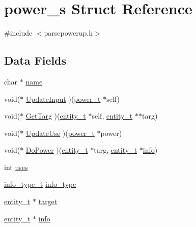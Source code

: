 \hypertarget{structpower__s}{}\section{power\+\_\+s Struct Reference}
\label{structpower__s}


{\ttfamily \#include $<$parsepowerup.\+h$>$}

\subsection*{Data Fields}
\begin{DoxyCompactItemize}
\item 
char $\ast$ \hyperlink{structpower__s_a5ac083a645d964373f022d03df4849c8}{name}
\item 
void($\ast$ \hyperlink{structpower__s_a99fd6ee1c03eaf0de0f3e2c71237db69}{Update\+Input} )(\hyperlink{parsepowerup_8h_a5b6034e874b6462f78a13c5202a4d2eb}{power\+\_\+t} $\ast$self)
\item 
void($\ast$ \hyperlink{structpower__s_a8e7faa42ca042b4df438d3c82427d2ee}{Get\+Targ} )(\hyperlink{entity_8h_ad0c3149de5542539dcb5c9251c68fbd2}{entity\+\_\+t} $\ast$self, \hyperlink{entity_8h_ad0c3149de5542539dcb5c9251c68fbd2}{entity\+\_\+t} $\ast$$\ast$targ)
\item 
void($\ast$ \hyperlink{structpower__s_a3cad653c3718314662c4a98659778999}{Update\+Use} )(\hyperlink{parsepowerup_8h_a5b6034e874b6462f78a13c5202a4d2eb}{power\+\_\+t} $\ast$power)
\item 
void($\ast$ \hyperlink{structpower__s_a0547996a48a142c5c5006ce1dd3020a5}{Do\+Power} )(\hyperlink{entity_8h_ad0c3149de5542539dcb5c9251c68fbd2}{entity\+\_\+t} $\ast$targ, \hyperlink{entity_8h_ad0c3149de5542539dcb5c9251c68fbd2}{entity\+\_\+t} $\ast$\hyperlink{structpower__s_abdbfaddb317fd1c7b9bdd58ea49d0395}{info})
\item 
int \hyperlink{structpower__s_ab8646ebc46bf478ca09510b7a01c7223}{uses}
\item 
\hyperlink{parsepowerup_8h_a3482867a9df48b02d0dcfe459b6e81c5}{info\+\_\+type\+\_\+t} \hyperlink{structpower__s_a92e471ab75337ebde8ffbddf14890542}{info\+\_\+type}
\item 
\hyperlink{entity_8h_ad0c3149de5542539dcb5c9251c68fbd2}{entity\+\_\+t} $\ast$ \hyperlink{structpower__s_a6729e2052b01af694ccadb9c401b57a0}{target}
\item 
\hyperlink{entity_8h_ad0c3149de5542539dcb5c9251c68fbd2}{entity\+\_\+t} $\ast$ \hyperlink{structpower__s_abdbfaddb317fd1c7b9bdd58ea49d0395}{info}
\end{DoxyCompactItemize}


